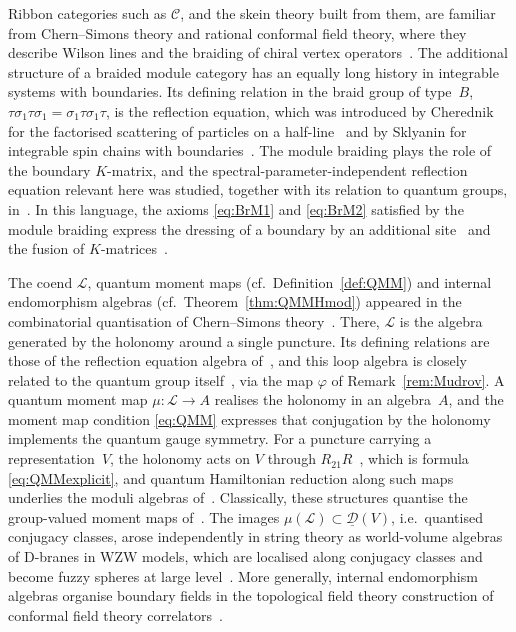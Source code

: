 \documentclass[12pt,dvipsnames]{article}
\numberwithin{equation}{section}
\theoremstyle{definition}
\newcommand{\cat}[1]{\mathcal{#1}}
\newcommand{\1}{\ensuremath{\mathbbm{1}}}
\begin{document}
Ribbon categories such as $\mathcal{C}$, and the skein theory built from them, are familiar from Chern--Simons theory and rational conformal field theory, where they describe Wilson lines and the braiding of chiral vertex
operators~\cite{Wi89,MS89}. 
The additional structure of a braided module category
has an equally long history in integrable systems with boundaries. Its defining relation in the braid group of type~$B$, $\tau\sigma_1\tau\sigma_1 = \sigma_1\tau\sigma_1\tau$, 
is the reflection equation, which was introduced by Cherednik for the factorised scattering of particles on a half-line~\cite{Ch84} and by Sklyanin for integrable spin chains with boundaries~\cite{Sk88}. 
The module braiding plays the role of the boundary $K$-matrix, and the spectral-parameter-independent reflection equation relevant here was studied, together with its relation to quantum groups, in~\cite{KS92}. In this language, the axioms \eqref{eq:BrM1} and \eqref{eq:BrM2} satisfied by the module braiding express the dressing of a boundary by an additional site~\cite{Sk88} and the fusion of
$K$-matrices~\cite{MN92}.
 
The coend $\mathcal{L}$, quantum moment maps (cf.\ Definition~\ref{def:QMM}) and internal endomorphism algebras 
(cf.\ Theorem~\ref{thm:QMMHmod}) appeared in the combinatorial quantisation of Chern--Simons theory~\cite{AGS94a,AGS94b,BR94}. There, $\mathcal{L}$ is the algebra generated by the
holonomy around a single puncture. Its defining relations are those of the
reflection equation algebra of~\cite{KS92}, and this loop algebra is closely
related to the quantum group itself~\cite{Al93}, via the map $\varphi$ of
Remark~\ref{rem:Mudrov}.  A quantum moment map $\mu\colon\mathcal{L}\to A$ realises 
the holonomy in an algebra~$A$, and the moment map condition \eqref{eq:QMM}
expresses that conjugation by the holonomy implements the quantum gauge symmetry. For a puncture carrying a representation~$V$, the holonomy acts on $V$ through $R_{21}R$~\cite{AS95}, which is formula
\eqref{eq:QMMexplicit},
and quantum Hamiltonian reduction along such maps underlies the moduli algebras of~\cite{AGS94b}. Classically, these structures quantise the group-valued moment maps of~\cite{AMM97}. 
The images $\mu(\mathcal{L})\subset \underline{\cat{D}}(V)$, 
i.e.\ quantised conjugacy classes, arose independently in string theory as world-volume algebras of D-branes in WZW models, which are localised along conjugacy classes and become fuzzy spheres at large level~\cite{ARS99}. 
More generally, internal endomorphism algebras organise boundary fields in the topological field theory construction of conformal field theory correlators~\cite{FRS02}.
 
\end{document}
